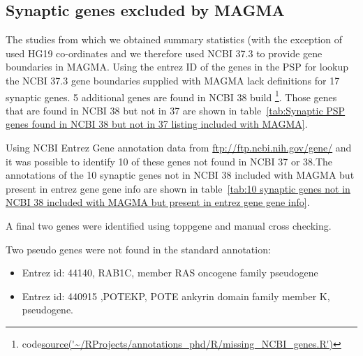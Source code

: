 \subsection{Synaptic genes excluded by MAGMA}
The studies from which we obtained summary statistics (with the exception of \cite{davies2016genome} used HG19 co-ordinates and we therefore used NCBI 37.3 to provide gene boundaries in MAGMA. Using the entrez ID of the genes in the PSP for lookup the NCBI 37.3 gene boundaries supplied with MAGMA lack definitions for 17 synaptic genes. 5 additional genes are found in NCBI 38 build \footnote{code\url{source('~/RProjects/annotations_phd/R/missing_NCBI_genes.R')}}. Those genes that are found in NCBI 38 but not in 37 are shown in table~\ref{tab:Synaptic PSP genes  found in NCBI 38 but not in 37 listing included with MAGMA}.

Using NCBI Entrez Gene annotation data from \url{ftp://ftp.ncbi.nih.gov/gene/}  and it was possible to identify 10 of these genes not found in NCBI 37 or 38.The annotations of the 10 synaptic genes not in NCBI 38 included with MAGMA but present in entrez gene gene info are shown in table~\ref{tab:10 synaptic genes not in NCBI 38 included with MAGMA but present in entrez gene gene info}.

A final two genes were identified using toppgene \cite{chen2009toppgene} and manual cross checking.

Two pseudo genes were not found in the standard annotation:
\begin{itemize}
    \item Entrez id:	44140, RAB1C, member RAS oncogene family pseudogene
    \item Entrez id:	440915	,POTEKP, POTE ankyrin domain family member K, pseudogene. 
\end{itemize} 



